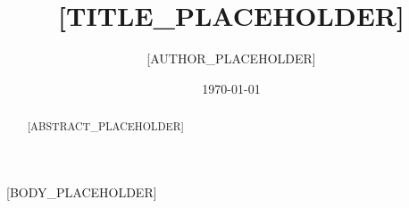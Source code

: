\documentclass[11pt,a4paper]{article}
\title{[TITLE_PLACEHOLDER]}
\author{[AUTHOR_PLACEHOLDER]}
\date{\today}
\begin{document}
\maketitle

\begin{abstract}
[ABSTRACT_PLACEHOLDER]
\end{abstract}

[BODY_PLACEHOLDER]



\end{document}
